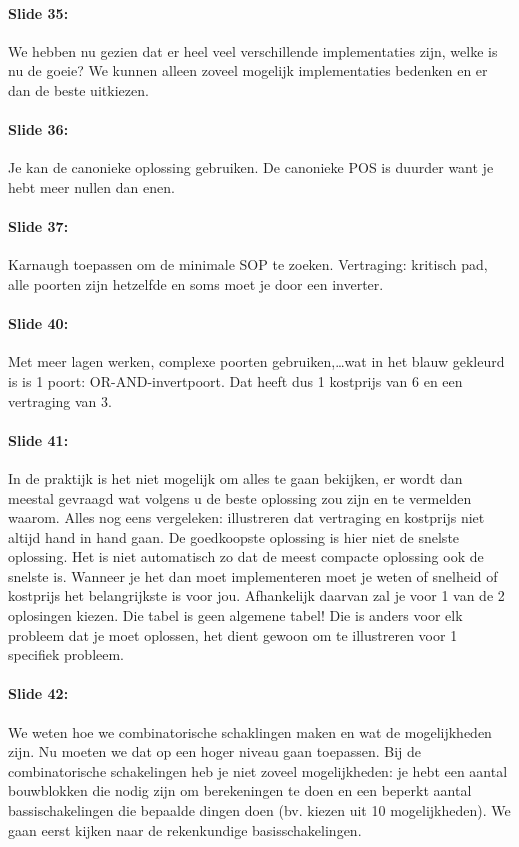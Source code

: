\documentclass[10pt,a4paper]{book}
\begin{document}
\paragraph{Slide 35:} We hebben nu gezien dat er heel veel verschillende implementaties zijn, welke is nu de goeie? We kunnen alleen zoveel mogelijk implementaties bedenken en er dan de beste uitkiezen.

\paragraph{Slide 36:} Je kan de canonieke oplossing gebruiken. De canonieke POS is duurder want je hebt meer nullen dan enen.

\paragraph{Slide 37:} Karnaugh toepassen om de minimale SOP te zoeken. Vertraging: kritisch pad, alle poorten zijn hetzelfde en soms moet je door een inverter. 

\paragraph{Slide 40:} Met meer lagen werken, complexe poorten gebruiken,\ldots wat in het blauw gekleurd is is 1 poort: OR-AND-invertpoort. Dat heeft dus 1 kostprijs van 6 en een vertraging van 3.

\paragraph{Slide 41:} In de praktijk is het niet mogelijk om alles te gaan bekijken, er wordt dan meestal gevraagd wat volgens u de beste oplossing zou zijn en te vermelden waarom. Alles nog eens vergeleken: illustreren dat vertraging en kostprijs niet altijd hand in hand gaan. De goedkoopste oplossing is hier niet de snelste oplossing. Het is niet automatisch zo dat de meest compacte oplossing ook de snelste is. Wanneer je het dan moet implementeren moet je weten of snelheid of kostprijs het belangrijkste is voor jou. Afhankelijk daarvan zal je voor 1 van de 2 oplosingen kiezen. Die tabel is geen algemene tabel! Die is anders voor elk probleem dat je moet oplossen, het dient gewoon om te illustreren voor 1 specifiek probleem.

\paragraph{Slide 42:} We weten hoe we combinatorische schaklingen maken en wat de mogelijkheden zijn. Nu moeten we dat op een hoger niveau gaan toepassen. Bij de combinatorische schakelingen heb je niet zoveel mogelijkheden: je hebt een aantal bouwblokken die nodig zijn om berekeningen te doen en een beperkt aantal bassischakelingen die bepaalde dingen doen (bv. kiezen uit 10 mogelijkheden). We gaan eerst kijken naar de rekenkundige basisschakelingen.
\end{document}
